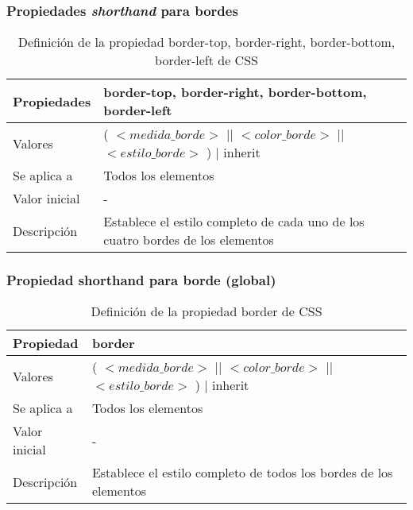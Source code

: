 
\begin{frame}
\frametitle{Propiedades \emph{shorthand} para bordes}

\begin{center}
  \begin{table}
   \begin{tabular}{p{1.8cm}p{7.8cm}}
Propiedades &\bf{border-top}, \bf{border-right}, \bf{border-bottom}, \bf{border-left} \\ \hline
Valores & ( $<medida\_borde>$ || $<color\_borde>$ || $<estilo\_borde>$ ) | inherit \\ \hline
Se aplica a & Todos los elementos \\ \hline
Valor inicial & - \\ \hline
Descripción & Establece el estilo completo de cada uno de los cuatro bordes de los elementos \\ \hline
 \end{tabular}
   \caption{Definición de la propiedad border-top, border-right, border-bottom, border-left de CSS}
 \end{table}
\end{center}

\end{frame}


\begin{frame}
\frametitle{Propiedad shorthand para borde (global)}

\begin{center}
  \begin{table}
   \begin{tabular}{p{1.8cm}p{7.8cm}}
Propiedad &\bf{border} \\ \hline
Valores & ( $<medida\_borde>$ || $<color\_borde>$ || $<estilo\_borde>$ ) | inherit \\ \hline
Se aplica a & Todos los elementos \\ \hline
Valor inicial & - \\ \hline
Descripción & Establece el estilo completo de todos los bordes de los elementos \\ \hline
 \end{tabular}
   \caption{Definición de la propiedad border de CSS}
 \end{table}
\end{center}

\end{frame}

